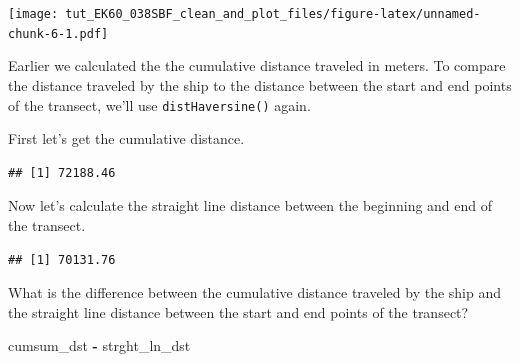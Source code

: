 \documentclass[]{article}
\newenvironment{Shaded}{\begin{snugshade}}{\end{snugshade}}
\newcommand{\DecValTok}[1]{\textcolor[rgb]{0.00,0.00,0.81}{#1}}
\newcommand{\KeywordTok}[1]{\textcolor[rgb]{0.13,0.29,0.53}{\textbf{#1}}}
\newcommand{\NormalTok}[1]{#1}
\newcommand{\OperatorTok}[1]{\textcolor[rgb]{0.81,0.36,0.00}{\textbf{#1}}}
\newcommand{\StringTok}[1]{\textcolor[rgb]{0.31,0.60,0.02}{#1}}
\begin{document}
\texttt{[image: tut\_EK60\_038SBF\_clean\_and\_plot\_files/figure-latex/unnamed-chunk-6-1.pdf]}

Earlier we calculated the the cumulative distance traveled in meters. To
compare the distance traveled by the ship to the distance between the
start and end points of the transect, we'll use \texttt{distHaversine()}
again.

First let's get the cumulative distance.

\begin{Shaded}
\end{Shaded}

\begin{verbatim}
## [1] 72188.46
\end{verbatim}

 Now let's calculate the straight line distance between the beginning
and end of the transect.

\begin{Shaded}
\end{Shaded}

\begin{verbatim}
## [1] 70131.76
\end{verbatim}

 What is the difference between the cumulative distance traveled by the
ship and the straight line distance between the start and end points of
the transect?

\begin{Shaded}
\begin{Highlighting}[]
\NormalTok{cumsum_dst }\OperatorTok{-}\StringTok{ }\NormalTok{strght_ln_dst}
\end{Highlighting}
\end{Shaded}
\end{document}
